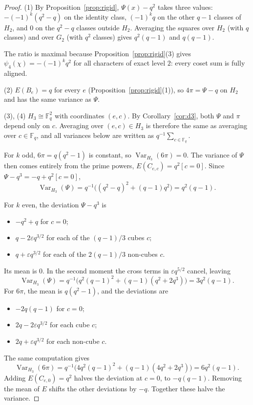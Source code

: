 \documentclass[11pt,a4paper]{amsart}
\theoremstyle{definition}
\theoremstyle{remark}
\newcommand{\F}{\mathbb{F}}
\newcommand{\Var}{\operatorname{Var}}
\begin{document}
\begin{proof}
(1) By Proposition~\ref{prop:rigid}, $\Psi(x)-q^2$ takes three values: $-(-1)^k(q^2-q)$ on the identity class,
$(-1)^kq$ on the other $q-1$ classes of $H_2$, and $0$ on the $q^2-q$ classes outside $H_2$. Averaging the squares
over $H_2$ (with $q$ classes) and over $G_2$ (with $q^2$ classes) gives $q^2(q-1)$ and $q(q-1)$.

The ratio is maximal because Proposition~\ref{prop:rigid}(3) gives $\psi_4(\chi)=-(-1)^kq^2$ for all characters of exact
level $2$: every coset sum is fully aligned.

(2) $E(B_e)=q$ for every $e$ (Proposition~\ref{prop:rigid}(1)), so $4\pi=\Psi-q$ on $H_2$ and has the same variance as
$\Psi$.

(3), (4) $H_3\cong\F_q^2$ with coordinates $(e,c)$. By Corollary~\ref{cor:d3}, both $\Psi$ and $\pi$ depend only on
$c$. Averaging over $(e,c)\in H_3$ is therefore the same as averaging over $c\in\F_q$, and all variances below are
written as $q^{-1}\sum_{c\in\F_q}$.

For $k$ odd, $6\pi=q(q^2-1)$ is constant, so $\Var_{H_3}(6\pi)=0$. The variance of $\Psi$ then comes entirely from
the prime powers, $E(C_{e,c})=q^2[c=0]$. Since $\Psi-q^3=-q+q^2[c=0]$,
\[
\Var_{H_3}(\Psi)=q^{-1}\bigl((q^2-q)^2+(q-1)q^2\bigr)=q^2(q-1).
\]

For $k$ even, the deviation $\Psi-q^3$ is
\begin{itemize}
\item $-q^2+q$ for $c=0$;
\item $q-2\varepsilon q^{3/2}$ for each of the $(q-1)/3$ cubes $c$;
\item $q+\varepsilon q^{3/2}$ for each of the $2(q-1)/3$ non-cubes $c$.
\end{itemize}
Its mean is $0$. In the second moment the cross terms in $\varepsilon q^{5/2}$ cancel, leaving
\[
\Var_{H_3}(\Psi)=q^{-1}\bigl(q^2(q-1)^2+(q-1)(q^2+2q^3)\bigr)=3q^2(q-1).
\]
For $6\pi$, the mean is $q(q^2-1)$, and the deviations are
\begin{itemize}
\item $-2q(q-1)$ for $c=0$;
\item $2q-2\varepsilon q^{3/2}$ for each cube $c$;
\item $2q+\varepsilon q^{3/2}$ for each non-cube $c$.
\end{itemize}
The same computation gives
\[
\Var_{H_3}(6\pi)=q^{-1}\bigl(4q^2(q-1)^2+(q-1)(4q^2+2q^3)\bigr)=6q^2(q-1).
\]
Adding $E(C_{e,0})=q^2$ halves the deviation at $c=0$, to $-q(q-1)$. Removing the mean of $E$ shifts the other
deviations by $-q$. Together these halve the variance.
\end{proof}
\end{document}
